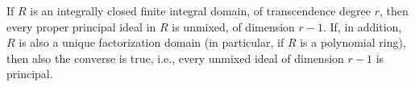 If $R$ is an integrally closed finite integral domain, of transcendence degree $r$, then every proper principal ideal in $R$ is unmixed, of dimension $r-1$. If, in addition, $R$ is also a unique factorization domain (in particular, if $R$ is a polynomial ring), then also the converse is true, i.e., every unmixed ideal of dimension $r-1$ is principal.
